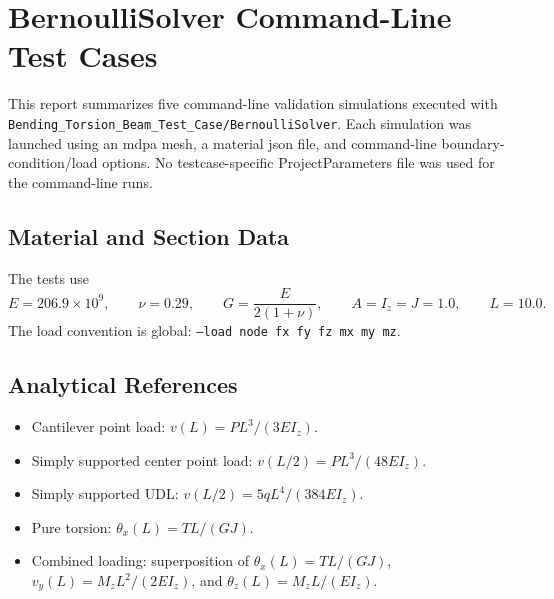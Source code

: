 \documentclass[11pt]{article}
\begin{document}
\section*{BernoulliSolver Command-Line Test Cases}

This report summarizes five command-line validation simulations executed with \texttt{Bending\_Torsion\_Beam\_Test\_Case/BernoulliSolver}.  Each simulation was launched using an mdpa mesh, a material json file, and command-line boundary-condition/load options.  No testcase-specific ProjectParameters file was used for the command-line runs.

\subsection*{Material and Section Data}
The tests use
\[
E = 206.9\times 10^9,\qquad \nu=0.29,\qquad G=\frac{E}{2(1+\nu)},\qquad A=I_z=J=1.0,\qquad L=10.0.
\]
The load convention is global: \texttt{--load node fx fy fz mx my mz}.

\subsection*{Analytical References}
\begin{itemize}
\item Cantilever point load: $v(L)=PL^3/(3EI_z)$.
\item Simply supported center point load: $v(L/2)=PL^3/(48EI_z)$.
\item Simply supported UDL: $v(L/2)=5qL^4/(384EI_z)$.
\item Pure torsion: $\theta_x(L)=TL/(GJ)$.
\item Combined loading: superposition of $\theta_x(L)=TL/(GJ)$, $v_y(L)=M_zL^2/(2EI_z)$, and $\theta_z(L)=M_zL/(EI_z)$.
\end{itemize}
\end{document}
